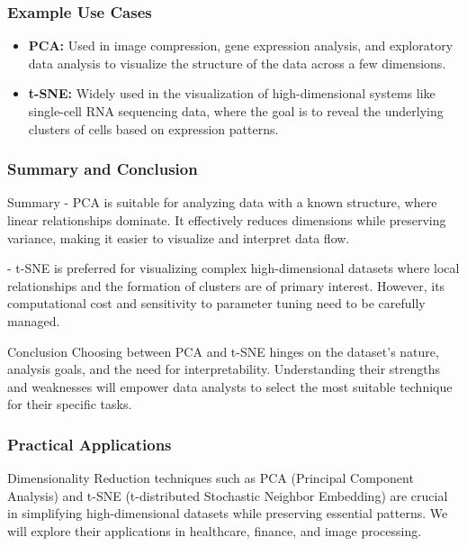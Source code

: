\documentclass{beamer}
\begin{document}
\begin{frame}[fragile]
    \frametitle{Example Use Cases}

    \begin{itemize}
        \item \textbf{PCA:} Used in image compression, gene expression analysis, and exploratory data analysis to visualize the structure of the data across a few dimensions.
        
        \item \textbf{t-SNE:} Widely used in the visualization of high-dimensional systems like single-cell RNA sequencing data, where the goal is to reveal the underlying clusters of cells based on expression patterns.
    \end{itemize}
\end{frame}

\begin{frame}[fragile]
    \frametitle{Summary and Conclusion}

    \begin{block}{Summary}
        - PCA is suitable for analyzing data with a known structure, where linear relationships dominate. It effectively reduces dimensions while preserving variance, making it easier to visualize and interpret data flow.
        
        - t-SNE is preferred for visualizing complex high-dimensional datasets where local relationships and the formation of clusters are of primary interest. However, its computational cost and sensitivity to parameter tuning need to be carefully managed.
    \end{block}
    
    \begin{block}{Conclusion}
        Choosing between PCA and t-SNE hinges on the dataset's nature, analysis goals, and the need for interpretability. Understanding their strengths and weaknesses will empower data analysts to select the most suitable technique for their specific tasks.
    \end{block}
\end{frame}

\begin{frame}[fragile]
    \frametitle{Practical Applications}
    Dimensionality Reduction techniques such as PCA (Principal Component Analysis) and t-SNE (t-distributed Stochastic Neighbor Embedding) are crucial in simplifying high-dimensional datasets while preserving essential patterns. 
    We will explore their applications in healthcare, finance, and image processing.
\end{frame}
\end{document}

